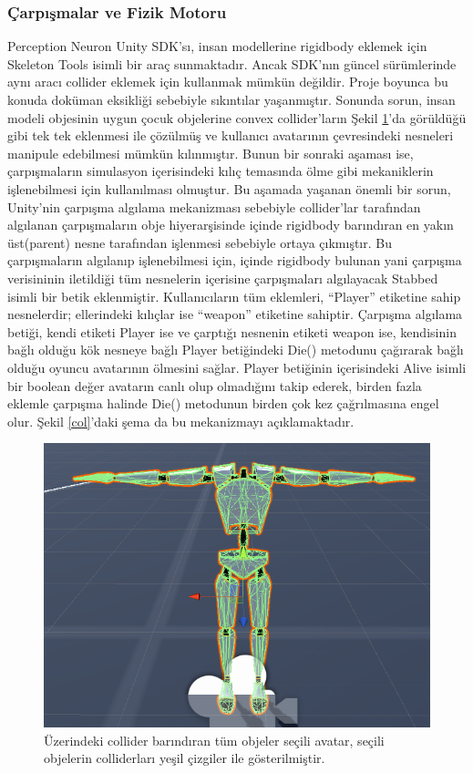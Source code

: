 \documentclass[a4paper, 12pt, titlepage]{article}
\begin{document}
\subsubsection{Çarpışmalar ve Fizik Motoru}
Perception Neuron Unity SDK’sı, insan modellerine rigidbody eklemek için Skeleton Tools isimli bir
araç sunmaktadır. Ancak SDK’nın güncel sürümlerinde aynı aracı collider eklemek için kullanmak
mümkün değildir. Proje boyunca bu konuda doküman eksikliği sebebiyle sıkıntılar yaşanmıştır.
Sonunda sorun, insan modeli objesinin uygun çocuk objelerine convex collider’ların Şekil \ref{c}’da
görüldüğü gibi tek tek eklenmesi ile çözülmüş ve kullanıcı avatarının çevresindeki nesneleri
manipule edebilmesi mümkün kılınmıştır. Bunun bir sonraki aşaması ise, çarpışmaların simulasyon
içerisindeki kılıç temasında ölme gibi mekaniklerin işlenebilmesi için kullanılması olmuştur. Bu
aşamada yaşanan önemli bir sorun, Unity’nin çarpışma algılama mekanizması sebebiyle collider’lar
tarafından algılanan çarpışmaların obje hiyerarşisinde içinde rigidbody barındıran en yakın
üst(parent) nesne tarafından işlenmesi sebebiyle ortaya çıkmıştır. Bu çarpışmaların algılanıp
işlenebilmesi için, içinde rigidbody bulunan yani çarpışma verisininin iletildiği tüm nesnelerin
içerisine çarpışmaları algılayacak Stabbed isimli bir betik eklenmiştir. Kullanıcıların tüm
eklemleri, “Player” etiketine sahip nesnelerdir; ellerindeki kılıçlar ise “weapon” etiketine
sahiptir. Çarpışma algılama betiği, kendi etiketi Player ise ve çarptığı nesnenin etiketi weapon
ise, kendisinin bağlı olduğu kök nesneye bağlı Player betiğindeki Die() metodunu çağırarak bağlı
olduğu oyuncu avatarının ölmesini sağlar. Player betiğinin içerisindeki Alive isimli bir boolean
değer avatarın canlı olup olmadığını takip ederek, birden fazla eklemle çarpışma halinde Die()
metodunun birden çok kez çağrılmasına engel olur. Şekil \ref{col}’daki şema da bu mekanizmayı
açıklamaktadır.

\begin{figure}[hbt!]
    \centering
        \includegraphics[width=6in]{images/c}
    \caption{Üzerindeki collider barındıran tüm objeler seçili avatar, seçili objelerin
             colliderları yeşil çizgiler ile gösterilmiştir.}
    \label{c}
\end{figure}
\end{document}
